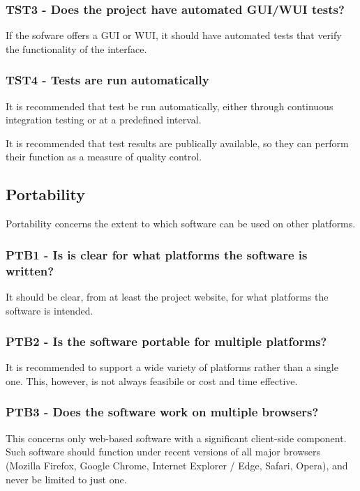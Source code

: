 \documentclass[a4paper,11pt]{article}
\begin{document}
\subsubsection{TST3 - Does the project have automated GUI/WUI tests?}

If the sofware offers a GUI or WUI, it should have automated tests that verify
the functionality of the interface.

\subsubsection{TST4 - Tests are run automatically}

It is recommended that test be run automatically, either through continuous
integration testing or at a predefined interval.

It is recommended that test results are publically available, so they can
perform their function as a measure of quality control.


\subsection{Portability}

Portability concerns the extent to which software can be used on other
platforms. 

\subsubsection{PTB1 - Is is clear for what platforms the software is written?}

It should be clear, from at least the project website, for what platforms the software
is intended.

\subsubsection{PTB2 - Is the software portable for multiple platforms?}

It is recommended to support a wide variety of platforms rather than a single
one. This, however, is not always feasibile or cost and time effective.

\subsubsection{PTB3 - Does the software work on multiple browsers?}

This concerns only web-based software with a significant client-side component.
Such software should function under recent versions of all major browsers
(Mozilla Firefox, Google Chrome, Internet Explorer / Edge, Safari, Opera), and
never be limited to just one.
\end{document}
